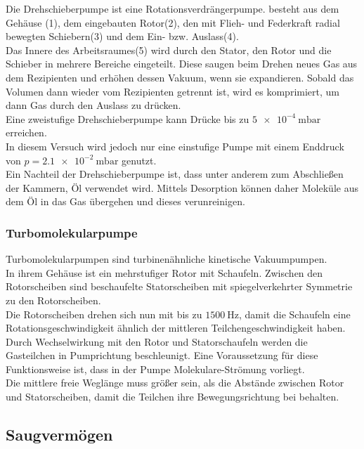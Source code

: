 			\noindent
			Die Drehschieberpumpe ist eine Rotationsverdrängerpumpe.	
			besteht aus dem Gehäuse (1), dem eingebauten Rotor(2), den mit Flieh- und Federkraft radial bewegten Schiebern(3) und dem Ein- bzw. Auslass(4).\\ 
			Das Innere des Arbeitsraumes(5) wird durch den Stator, den Rotor und die Schieber in mehrere Bereiche eingeteilt. 
			Diese saugen beim Drehen neues Gas aus dem Rezipienten und erhöhen dessen Vakuum, wenn sie expandieren.
			Sobald das Volumen dann wieder vom Rezipienten getrennt ist, wird es komprimiert, um dann Gas durch den Auslass zu drücken.\\
			Eine zweistufige Drehschieberpumpe kann Drücke bis zu $\SI{5e-4}{\milli\bar}$ erreichen. \\
			In diesem Versuch wird jedoch nur eine einstufige Pumpe mit einem Enddruck von $p = \SI{2.1 e-2}{\milli\bar}$ genutzt.\\
			Ein Nachteil der Drehschieberpumpe ist, dass unter anderem zum Abschließen der Kammern, Öl verwendet wird.
			Mittels Desorption können daher Moleküle aus dem Öl in das Gas übergehen und dieses verunreinigen.	 

			\cite{pfeiffer}
		\subsubsection{Turbomolekularpumpe}
		
			\noindent
			\cite{pfeiffer}
			Turbomolekularpumpen sind turbinenähnliche kinetische Vakuumpumpen.\\ 
			In ihrem Gehäuse ist ein mehrstufiger Rotor mit Schaufeln.
			Zwischen den Rotorscheiben sind beschaufelte Statorscheiben mit spiegelverkehrter Symmetrie zu den Rotorscheiben.\\
			Die Rotorscheiben drehen sich nun mit bis zu $\SI{1500}{\hertz}$, damit die Schaufeln eine Rotationsgeschwindigkeit ähnlich der mittleren Teilchengeschwindigkeit haben. \\
			Durch Wechselwirkung mit den Rotor und Statorschaufeln werden die Gasteilchen in Pumprichtung beschleunigt.
			Eine Voraussetzung für diese Funktionsweise ist, dass in der Pumpe Molekulare-Strömung vorliegt.\\ 
			Die mittlere freie Weglänge muss größer sein, als die Abstände zwischen Rotor und Statorscheiben, damit die Teilchen ihre Bewegungsrichtung bei behalten. 
			  						
	\subsection{Saugvermögen}

